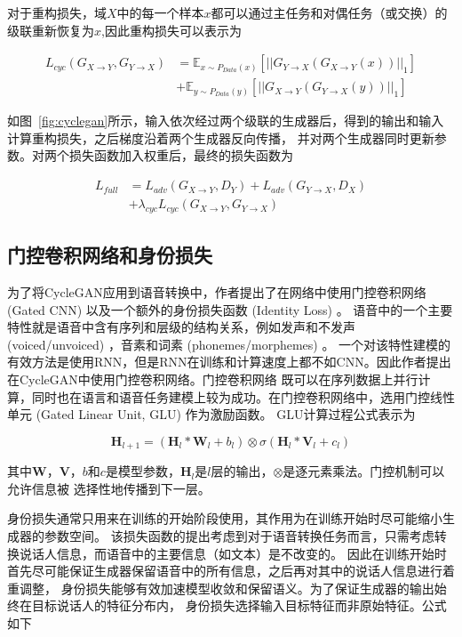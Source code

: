 对于重构损失，域$X$中的每一个样本$x$都可以通过主任务和对偶任务（或交换）的级联重新恢复为$x$,因此重构损失可以表示为

\begin{align}
    L_{cyc}(G_{X\rightarrow Y},G_{Y\rightarrow X}) & = \mathbb{E}_{x\sim P_{Data}(x)}\left[\left| \left| G_{Y\rightarrow X}(G_{X\rightarrow Y}(x))\right| \right|_1 \right] \\
    & + \mathbb{E}_{y\sim P_{Data}(y)}\left[\left| \left| G_{X\rightarrow Y}(G_{Y\rightarrow X}(y))\right| \right|_1 \right]
\end{align}

如图~\ref{fig:cyclegan}所示，输入依次经过两个级联的生成器后，得到的输出和输入计算重构损失，之后梯度沿着两个生成器反向传播，
并对两个生成器同时更新参数。对两个损失函数加入权重后，最终的损失函数为

\begin{align}
    L_{full}& =L_{adv}(G_{X\rightarrow Y},D_Y)+L_{adv}(G_{Y\rightarrow X},D_X)\\
    & +\lambda_{cyc}L_{cyc}(G_{X\rightarrow Y},G_{Y\rightarrow X})
\end{align}

\subsection{门控卷积网络和身份损失}
为了将CycleGAN应用到语音转换中，作者提出了在网络中使用门控卷积网络 (Gated CNN) 以及一个额外的身份损失函数 (Identity Loss) 。
语音中的一个主要特性就是语音中含有序列和层级的结构关系，例如发声和不发声 (voiced/unvoiced) ，音素和词素 (phonemes/morphemes) 。
一个对该特性建模的有效方法是使用RNN，但是RNN在训练和计算速度上都不如CNN。因此作者提出在CycleGAN中使用门控卷积网络。门控卷积网络
既可以在序列数据上并行计算，同时也在语言和语音任务建模上较为成功。在门控卷积网络中，选用门控线性单元 (Gated Linear Unit, GLU) 作为激励函数。
GLU计算过程公式表示为

\begin{equation}
    \mathbf{H}_{l+1}=(\mathbf{H}_l \ast \mathbf{W}_l + b_l)\otimes \sigma (\mathbf{H}_l \ast \mathbf{V}_l + c_l)
\end{equation}

其中$\mathbf{W}$，$\mathbf{V}$，$b$和$c$是模型参数，$\mathbf{H}_l$是$l$层的输出，$\otimes$是逐元素乘法。门控机制可以允许信息被
选择性地传播到下一层。

身份损失通常只用来在训练的开始阶段使用，其作用为在训练开始时尽可能缩小生成器的参数空间。
该损失函数的提出考虑到对于语音转换任务而言，只需考虑转换说话人信息，而语音中的主要信息（如文本）是不改变的。
因此在训练开始时首先尽可能保证生成器保留语音中的所有信息，之后再对其中的说话人信息进行着重调整，
身份损失能够有效加速模型收敛和保留语义。为了保证生成器的输出始终在目标说话人的特征分布内，
身份损失选择输入目标特征而非原始特征。公式如下

